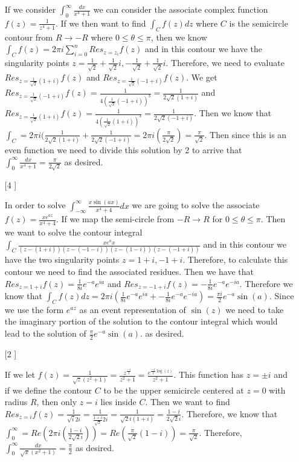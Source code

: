 \documentclass{article}
\theoremstyle{definition}
\begin{document}
\begin{enumerate}
    If we consider $\int_0^\infty \frac{dx}{x^4 + 1}$ we can consider the associate complex function $f(z) = \frac{1}{z^4 + 1}$. If we then want to find $\int_Cf(z)dz$ where $C$ is the semicircle contour from $R\to -R$ where $0 \leq \theta \leq \pi$, then we know $\int_Cf(z) = 2\pi i\sum_{i = 0}^nRes_{z = z_i}f(z)$ and in this contour we have the singularity points $z = \frac{1}{\sqrt{2}} + \frac{1}{\sqrt{2}}i, -\frac{1}{\sqrt{2}} + \frac{1}{\sqrt{2}}i.$ Therefore, we need to evaluate $Res_{z = \frac{1}{\sqrt{2}} (1 + i)}f(z)$ and $Res_{z = \frac{1}{\sqrt{2}} (-1 + i)}f(z)$. We get $Res_{z = \frac{1}{\sqrt{2}}(-1 + i)}f(z) = \frac{1}{4(\frac{1}{\sqrt{2}}(-1 + i))^3} = \frac{1}{2\sqrt{2}(1 + i)}$ and $Res_{z = \frac{1}{\sqrt{2}}(1 + i)}f(z) = \frac{1}{4(\frac{1}{\sqrt{2}}(1 + i))^3} = \frac{1}{2\sqrt{2}(-1 + i)}$. Then we know that $\int_C = 2\pi i (\frac{1}{2\sqrt{2}(1 + i)} + \frac{1}{2\sqrt{2}(-1 + i)} = 2\pi i (\frac{\pi}{2\sqrt{2}}) = \frac{\pi}{\sqrt{2}}$. Then since this is an even function we need to divide this solution by 2 to arrive that $\int_0^\infty\frac{dx}{x^4+1} = \frac{\pi}{2\sqrt{2}}$ as desired.
    
    \item [[\phantom{-}4]]
    
    In order to solve $\int_{-\infty}^{\infty}\frac{x\sin(ax)}{x^4 + 4}dx$ we are going to solve the associate $f(z) = \frac{xe^{az}}{x^4 + 4}$. If we map the semi-circle from $-R\to R$ for $0\leq \theta \leq \pi$. Then we want to solve the contour integral \\ $\int_C\frac{xe^ax}{(z - (1 + i))(z - (-1 - i))(z - (1 - i))(z - (-1 + i))}$ and in this contour we have the two singularity points $z = 1 + i, -1 + i$. Therefore, to calculate this contour we need to find the associated residues. Then we have that $Res_{z = 1 + i}f(z) = \frac{1}{8i}e^{-a}e^{ia}$ and $Res_{z = -1 + i}f(z) = -\frac{1}{8i}e^{-a}e^{-ia}$. Therefore we know that $\int_Cf(z)dz = 2\pi i (\frac{1}{8i}e^{-a}e^{ia} + -\frac{1}{8i}e^{-a}e^{-ia}) = \frac{\pi i }{2}e^{-a}\sin(a)$. Since we use the form $e^{az}$ as an event representation of $\sin(z)$ we need to take the imaginary portion of the solution to the contour integral which would lead to the solution of $\frac{\pi}{2}e^{-a}\sin(a).$ as desired.
    
    \item [[\phantom{-}2]]
    
    If we let $f(z) = \frac{1}{\sqrt{z}(z^2 + 1)} = \frac{z^{\frac{-1}{2}}}{z^2 + 1} = \frac{e^{\frac{-1}{2}\log(z)}}{z^2 + 1}$. This function has $z = \pm i$ and if we define the contour $C$ to be the upper semicircle centered at $z = 0$ with radius $R$, then only $z = i$ lies inside $C.$ Then we want to find $Res_{z = i}f(z) = \frac{1}{\sqrt{i}2i} = \frac{1}{\frac{1 + i}{\sqrt{2}}2i} = \frac{1}{\sqrt{2}i(1 + i)} = \frac{1 - i}{2\sqrt{2}i}$. Therefore, we know that $\int_0^\infty = Re(2\pi i (\frac{1 - i}{2\sqrt{2}i})) = Re(\frac{\pi}{\sqrt{2}}(1 - i)) = \frac{\pi}{\sqrt{2}}$. Therefore, $\int_0^\infty \frac{dx}{\sqrt{x}(x^2 + 1)} = \frac{\pi}{2}$ as desired.
    

\end{enumerate}
\end{document}
